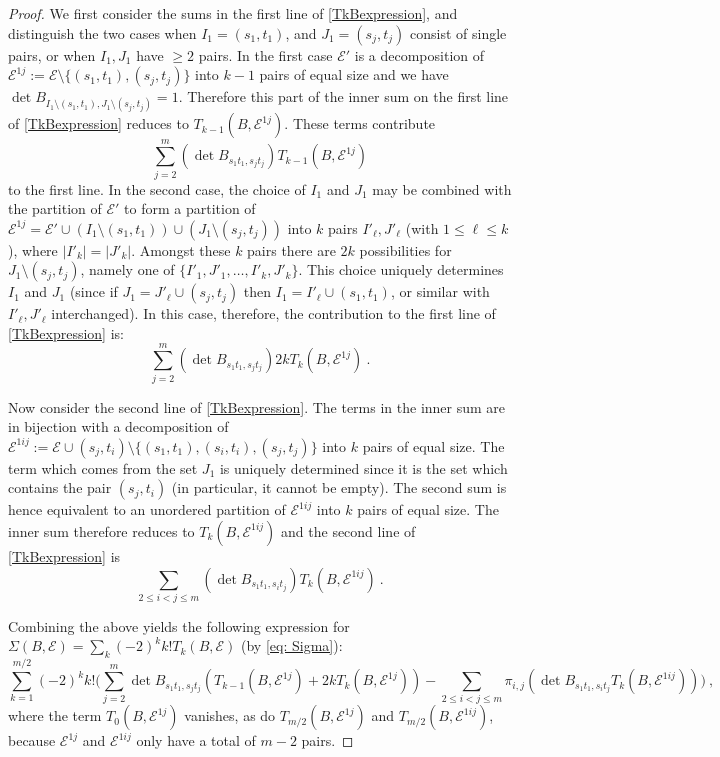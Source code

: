 \documentclass[10pt]{amsart}
\newcommand{\sE}{\mathcal{E}}
\theoremstyle{plain}
\newcommand{\0}{\color{blue}{\mathsf{0}}}
\begin{document}
\begin{proof}
We first consider the sums in the  first line of \eqref{TkBexpression}, and  distinguish the two cases when $I_1=(s_1,t_1)$, and $J_1=(s_j,t_j)$ consist of  single pairs, or when $I_1,J_1$ have $\geq 2$ pairs. 
In the first case $\sE'$ is a decomposition of $\sE^{1j}:=\sE\setminus\{(s_1,t_1),(s_j,t_j)\}$ into $k-1$ pairs of equal size and we have   $\det B_{I_1\setminus(s_1,t_1),J_1\setminus(s_j,t_j)}=1$. Therefore this part of the inner sum on the first line of \eqref{TkBexpression} reduces to $T_{k-1}(B,\sE^{1j})$. These terms contribute
\[  \sum_{j=2}^m (\det B_{s_1t_1,s_jt_j}) T_{k-1}(B, \sE^{1j})  \]
to the first line.
In the second case, the choice of $I_1$ and $J_1$ may be  combined with
the partition of $\sE'$ to form a partition of $\sE^{1j}= \sE' \cup (I_1 \setminus (s_1,t_1)) \cup (J_1 \setminus (s_j,t_j))$   into $k$ pairs $I'_{\ell}, J'_{\ell}$ (with $1\leq \ell \leq k$), where $|I'_k| = |J'_k|$. 
Amongst  these $k$ pairs there are $2k$ possibilities for $J_1\setminus(s_j,t_j)$, namely one of $\{I'_1, J'_1, \ldots ,I'_k ,J'_k\}$.
This choice uniquely determines $I_1$ and $J_1$ (since if $J_1 =J'_\ell\cup (s_j,t_j) $ then $I_1 =I'_\ell\cup (s_1,t_1)$, or similar with $I'_{\ell}, J'_{\ell}$ interchanged).  In this case, therefore, the contribution to the first line of \eqref{TkBexpression} is:
\[  \sum_{j=2}^m (\det B_{s_1t_1,s_jt_j})  2kT_k(B, \sE^{1j})\ .  \]

Now consider the second line of \eqref{TkBexpression}. The  terms in the inner sum are in bijection with a decomposition of 
$\sE^{1ij}:=\sE\cup (s_j,t_i)\setminus \{(s_1,t_1),(s_i,t_i),(s_j,t_j)\}$ into $k$ pairs of equal size. The term which comes from 
the set $J_1$ is uniquely determined    since it is the
set which contains the pair $(s_j,t_i)$ (in particular, it cannot be empty).
The second sum is hence equivalent to an unordered partition of $\sE^{1ij}$ into $k$ pairs
of equal size. The inner sum therefore reduces to  $T_k(B,\sE^{1ij})$ and the second
line of \eqref{TkBexpression} is
\[  \sum_{2\le i<j\leq m} (\det B_{s_1t_1,s_it_j})  T_k(B, \sE^{1ij})\ .  \]

Combining the above yields the following  expression for  $\Sigma(B,\sE)=\sum_k (-2)^k k!T_k(B,\sE)   $  (by  \eqref{eq: Sigma}):
$$
\sum_{k=1}^{m/2}(-2)^kk!\Bigg(\sum_{j=2}^m\det B_{s_1t_1,s_jt_j}(T_{k-1}(B,\sE^{1j})+2kT_k(B,\sE^{1j}))-\sum_{2\leq i<j\leq m}\pi_{i,j}(\det B_{s_1t_1,s_it_j}T_k(B,\sE^{1ij}))\Bigg)\ ,
$$
where the term $T_0(B,\sE^{1j})$ vanishes, as do $T_{m/2}(B,\sE^{1 j})$ and $T_{m/2}(B,\sE^{1 i j})$,  because $\sE^{1 j}$ and $\sE^{1 i j}$ only have a total of  $m-2$ pairs.


\end{proof}
\end{document}
